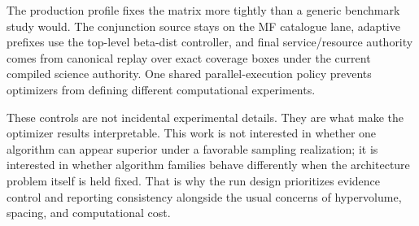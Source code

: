     The production profile fixes the matrix more tightly than a generic benchmark study would. The conjunction source stays on the MF catalogue lane, adaptive prefixes use the top-level beta-dist controller, and final service/resource authority comes from canonical replay over exact coverage boxes under the current compiled science authority. One shared parallel-execution policy prevents optimizers from defining different computational experiments.

    These controls are not incidental experimental details. They are what make the optimizer results interpretable. This work is not interested in whether one algorithm can appear superior under a favorable sampling realization; it is interested in whether algorithm families behave differently when the architecture problem itself is held fixed. That is why the run design prioritizes evidence control and reporting consistency alongside the usual concerns of hypervolume, spacing, and computational cost.


